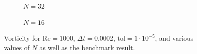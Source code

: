 \begin{figure}[p]
    \vspace{0.5cm}
    
    \begin{subfigure}[b]{0.49\textwidth}
	    \caption{$N = 32$}
    	\label{fig:ve}
    \end{subfigure}
    \begin{subfigure}[b]{0.49\textwidth}
	    \caption{$N = 16$}
	    \label{fig:vf}
    \end{subfigure}
    \caption{Vorticity for $\text{Re} = 1000$, $\Delta t = 0.0002$, $\text{tol} = 1 \cdot 10^{-5}$, and various values of $N$ as well as the benchmark result.}
    \label{fig:allvorticity}
\end{figure}

